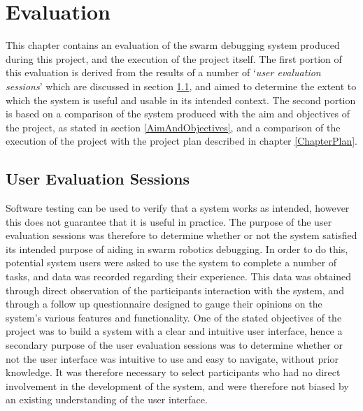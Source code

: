
\chapter[Evaluation]{Evaluation} %

\label{ChapterEvaluation} %

This chapter contains an evaluation of the swarm debugging system produced during this project, and the execution of the project itself. The first portion of this evaluation is derived from the results of a number of `\textit{user evaluation sessions}' which are discussed in section \ref{UserEvaluationSessions}, and aimed to determine the extent to which the system is useful and usable in its intended context. The second portion is based on a comparison of the system produced with the aim and objectives of the project, as stated in section \ref{AimAndObjectives}, and a comparison of the execution of the project with the project plan described in chapter \ref{ChapterPlan}.


\section{User Evaluation Sessions} \label{UserEvaluationSessions}

Software testing can be used to verify that a system works as intended, however this does not guarantee that it is useful in practice. The purpose of the user evaluation sessions was therefore to determine whether or not the system satisfied its intended purpose of aiding in swarm robotics debugging. In order to do this, potential system users were asked to use the system to complete a number of tasks, and data was recorded regarding their experience. This data was obtained through direct observation of the participants interaction with the system, and through a follow up questionnaire designed to gauge their opinions on the system's various features and functionality. One of the stated objectives of the project was to build a system with a clear and intuitive user interface, hence a secondary purpose of the user evaluation sessions was to determine whether or not the user interface was intuitive to use and easy to navigate, without prior knowledge. It was therefore necessary to select participants who had no direct involvement in the development of the system, and were therefore not biased by an existing understanding of the user interface.

